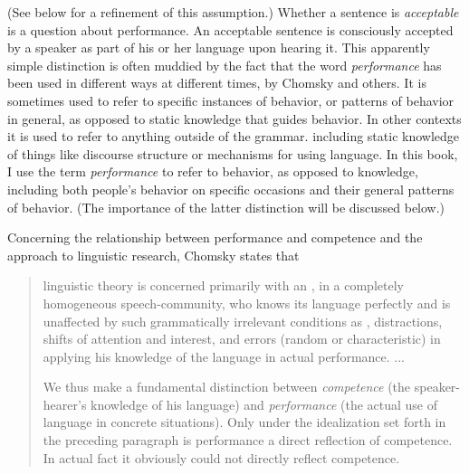  (See below for a refinement of this assumption.) Whether a sentence is \textit{acceptable} is a question about performance. An acceptable sentence is consciously accepted by a speaker as part of his or her language upon hearing it. This apparently simple distinction is often muddied by the fact that the word \textit{performance} has been used in different ways at different times, by Chomsky and others. It is sometimes used to refer to specific instances of behavior, or patterns of behavior in general, as opposed to static knowledge that guides behavior. In other contexts it is used to refer to anything outside of the grammar. including static knowledge of things like discourse structure or mechanisms for using language. In this book, I use the term \textit{performance} to refer to behavior, as opposed to knowledge, including both people's behavior on specific
occasions and their general patterns of behavior. (The importance of the latter distinction will be discussed below.)

Concerning the relationship between performance and competence and the approach to linguistic research, Chomsky states that

\begin{quote}
linguistic theory is concerned primarily with an , in a completely homogeneous speech-community, who knows its language perfectly and is unaffected by such grammatically irrelevant conditions as , distractions, shifts of attention and interest, and errors (random or characteristic) in applying his knowledge of the language in actual performance. ...

We thus make a fundamental distinction between \textit{competence} (the speaker-hearer's knowledge of his language) and \textit{performance} (the actual use of language in concrete situations). Only under the idealization set forth in the preceding paragraph is performance a direct reflection of competence. In actual fact it obviously could not directly reflect competence. \citep[3\textendash{}4]{Chomsky1965}
\end{quote}

